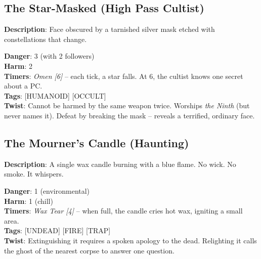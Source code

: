 
\subsection*{The Star-Masked (High Pass Cultist)}

\noindent\textbf{Description}: Face obscured by a tarnished silver mask etched with constellations that change.

\noindent\textbf{Danger}: 3 (with 2 followers)\\
\textbf{Harm}: 2\\
\textbf{Timers}: \emph{Omen [6]} -- each tick, a star falls. At 6, the cultist knows one secret about a PC.\\
\textbf{Tags}: [HUMANOID] [OCCULT]\\
\textbf{Twist}: Cannot be harmed by the same weapon twice. Worships \emph{the Ninth} (but never names it). Defeat by breaking the mask -- reveals a terrified, ordinary face.


\subsection*{The Mourner's Candle (Haunting)}

\noindent\textbf{Description}: A single wax candle burning with a blue flame. No wick. No smoke. It whispers.

\noindent\textbf{Danger}: 1 (environmental)\\
\textbf{Harm}: 1 (chill)\\
\textbf{Timers}: \emph{Wax Tear [4]} -- when full, the candle cries hot wax, igniting a small area.\\
\textbf{Tags}: [UNDEAD] [FIRE] [TRAP]\\
\textbf{Twist}: Extinguishing it requires a spoken apology to the dead. Relighting it calls the ghost of the nearest corpse to answer one question.


